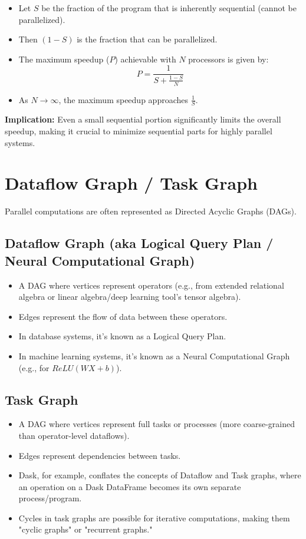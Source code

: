 \documentclass{article}
\begin{document}
\begin{itemize}
    \item Let $S$ be the fraction of the program that is inherently sequential (cannot be parallelized).
    \item Then $(1-S)$ is the fraction that can be parallelized.
    \item The maximum speedup ($P$) achievable with $N$ processors is given by:
    \[
    P = \frac{1}{S + \frac{1-S}{N}}
    \]
    \item As $N \to \infty$, the maximum speedup approaches $\frac{1}{S}$.
\end{itemize}
\textbf{Implication:} Even a small sequential portion significantly limits the overall speedup, making it crucial to minimize sequential parts for highly parallel systems.

\section*{Dataflow Graph / Task Graph}
Parallel computations are often represented as Directed Acyclic Graphs (DAGs).

\subsection*{Dataflow Graph (aka Logical Query Plan / Neural Computational Graph)}
\begin{itemize}
    \item A DAG where vertices represent operators (e.g., from extended relational algebra or linear algebra/deep learning tool's tensor algebra).
    \item Edges represent the flow of data between these operators.
    \item In database systems, it's known as a Logical Query Plan.
    \item In machine learning systems, it's known as a Neural Computational Graph (e.g., for $ReLU(WX+b)$).
\end{itemize}

\subsection*{Task Graph}
\begin{itemize}
    \item A DAG where vertices represent full tasks or processes (more coarse-grained than operator-level dataflows).
    \item Edges represent dependencies between tasks.
    \item Dask, for example, conflates the concepts of Dataflow and Task graphs, where an operation on a Dask DataFrame becomes its own separate process/program.
    \item Cycles in task graphs are possible for iterative computations, making them "cyclic graphs" or "recurrent graphs."
\end{itemize}
\end{document}

